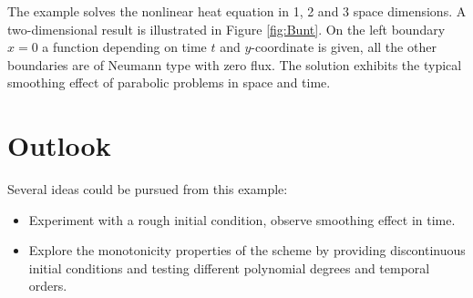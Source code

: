 \documentclass[a4paper,12pt]{article}
\begin{document}
The example solves the nonlinear heat equation in 1, 2 and 3 space dimensions.
A two-dimensional result is illustrated in Figure \ref{fig:Bunt}. On the left boundary
$x=0$ a function depending on time $t$ and $y$-coordinate is given, all the other
boundaries are of Neumann type with zero flux. The solution exhibits the
typical smoothing effect of parabolic problems in space and time.

\section{Outlook}

Several ideas could be pursued from this example:
\begin{itemize}
\item Experiment with a rough initial condition, observe
smoothing effect in time.
\item Explore the monotonicity properties of the scheme by
providing discontinuous initial conditions and testing different
polynomial degrees and temporal orders.
\end{itemize}



\end{document}
